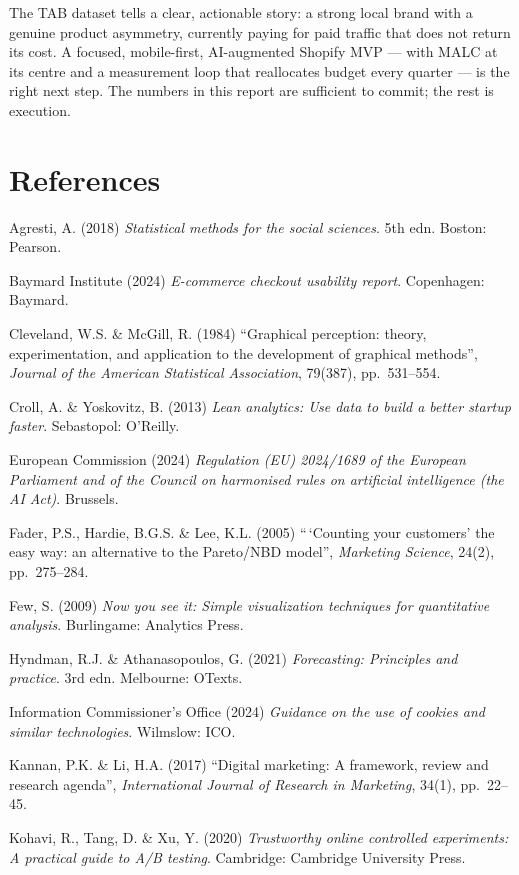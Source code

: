 \documentclass[
  11pt,
]{article}
\begin{document}
The TAB dataset tells a clear, actionable story: a strong local brand
with a genuine product asymmetry, currently paying for paid traffic that
does not return its cost. A focused, mobile-first, AI-augmented Shopify
MVP --- with MALC at its centre and a measurement loop that reallocates
budget every quarter --- is the right next step. The numbers in this
report are sufficient to commit; the rest is execution.

\newpage

\section{References}\label{references}

Agresti, A. (2018) \emph{Statistical methods for the social sciences}.
5th edn. Boston: Pearson.

Baymard Institute (2024) \emph{E-commerce checkout usability report}.
Copenhagen: Baymard.

Cleveland, W.S. \& McGill, R. (1984) ``Graphical perception: theory,
experimentation, and application to the development of graphical
methods'', \emph{Journal of the American Statistical Association},
79(387), pp.~531--554.

Croll, A. \& Yoskovitz, B. (2013) \emph{Lean analytics: Use data to
build a better startup faster}. Sebastopol: O'Reilly.

European Commission (2024) \emph{Regulation (EU) 2024/1689 of the
European Parliament and of the Council on harmonised rules on artificial
intelligence (the AI Act)}. Brussels.

Fader, P.S., Hardie, B.G.S. \& Lee, K.L. (2005) ``\,`Counting your
customers' the easy way: an alternative to the Pareto/NBD model'',
\emph{Marketing Science}, 24(2), pp.~275--284.

Few, S. (2009) \emph{Now you see it: Simple visualization techniques for
quantitative analysis}. Burlingame: Analytics Press.

Hyndman, R.J. \& Athanasopoulos, G. (2021) \emph{Forecasting: Principles
and practice}. 3rd edn. Melbourne: OTexts.

Information Commissioner's Office (2024) \emph{Guidance on the use of
cookies and similar technologies}. Wilmslow: ICO.

Kannan, P.K. \& Li, H.A. (2017) ``Digital marketing: A framework, review
and research agenda'', \emph{International Journal of Research in
Marketing}, 34(1), pp.~22--45.

Kohavi, R., Tang, D. \& Xu, Y. (2020) \emph{Trustworthy online
controlled experiments: A practical guide to A/B testing}. Cambridge:
Cambridge University Press.
\end{document}
